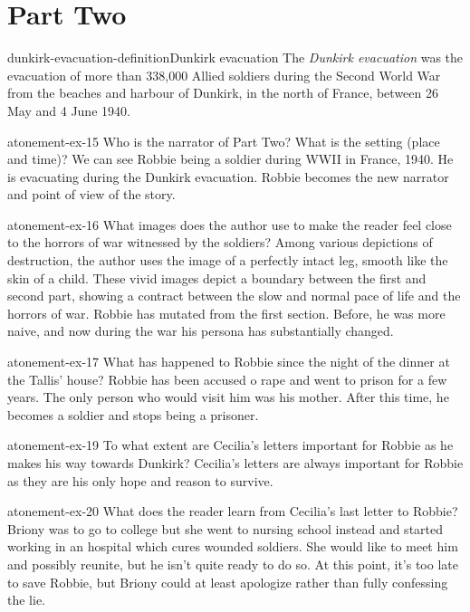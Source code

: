 \documentclass[preview]{standalone}
\begin{document}
\genpage

\section{Part Two}

\begin{snippetdefinition}{dunkirk-evacuation-definition}{Dunkirk evacuation}
    The \textit{Dunkirk evacuation} was the evacuation of more than 338,000
    Allied soldiers during the Second World War from the beaches
    and harbour of Dunkirk, in the north of France, between 26 May and 4 June 1940. 
\end{snippetdefinition}

\begin{snippetexercise}{atonement-ex-15}
    {Who is the narrator of Part Two? What is the setting (place and time)?}
    We can see Robbie being a soldier during WWII in France, 1940.
    He is evacuating during the Dunkirk evacuation.
    Robbie becomes the new narrator and point of view of the story.
\end{snippetexercise}

\begin{snippetexercise}{atonement-ex-16}
    {What images does the author use to make the reader feel close to the horrors of war witnessed
    by the soldiers?}
    Among various depictions of destruction, the author uses the image of a perfectly
    intact leg, smooth like the skin of a child.
    These vivid images depict a boundary between the first and second
    part, showing a contract between the slow and normal pace of life
    and the horrors of war.
    Robbie has mutated from the first section. Before, he was more naive,
    and now during the war his persona has substantially changed.
\end{snippetexercise}

\begin{snippetexercise}{atonement-ex-17}
    {What has happened to Robbie since the night of the dinner at the Tallis' house?}
    Robbie has been accused o rape and went to prison for a few years.
    The only person who would visit him was his mother.
    After this time, he becomes a soldier and stops being a prisoner.
\end{snippetexercise}

\begin{snippetexercise}{atonement-ex-19}
    {To what extent are Cecilia's letters important for Robbie as he makes his way towards Dunkirk?}
    Cecilia's letters are always important for Robbie as they are
    his only hope and reason to survive.
\end{snippetexercise}

\begin{snippetexercise}{atonement-ex-20}
    {What does the reader learn from Cecilia's last letter to Robbie?}
    Briony was to go to college but she went to nursing school instead
    and started working in an hospital which cures wounded soldiers.
    She would like to meet him and possibly reunite,
    but he isn't quite ready to do so.
    At this point, it's too late to save Robbie, but Briony could at least
    apologize rather than fully confessing the lie.
\end{snippetexercise}
\end{document}
